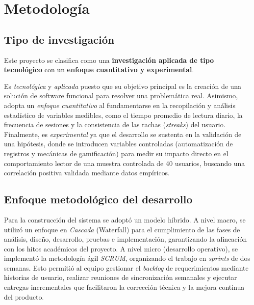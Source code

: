 \documentclass[12pt, atypical, journal]{article}
\begin{document}
\section{Metodología}

\subsection{Tipo de investigación}
Este proyecto se clasifica como una \textbf{investigación aplicada de tipo tecnológico} con un \textbf{enfoque cuantitativo y experimental}. 

Es \textit{tecnológica} y \textit{aplicada} puesto que su objetivo principal es la creación de una solución de software funcional para resolver una problemática real. Asimismo, adopta un \textit{enfoque cuantitativo} al fundamentarse en la recopilación y análisis estadístico de variables medibles, como el tiempo promedio de lectura diario, la frecuencia de sesiones y la consistencia de las rachas (\textit{streaks}) del usuario. Finalmente, es \textit{experimental} ya que el desarrollo se sustenta en la validación de una hipótesis, donde se introducen variables controladas (automatización de registros y mecánicas de gamificación) para medir su impacto directo en el comportamiento lector de una muestra controlada de 40 usuarios, buscando una correlación positiva validada mediante datos empíricos.

\subsection{Enfoque metodológico del desarrollo}
Para la construcción del sistema se adoptó un modelo híbrido. A nivel macro, se utilizó un enfoque en \textit{Cascada} (Waterfall) para el cumplimiento de las fases de análisis, diseño, desarrollo, pruebas e implementación, garantizando la alineación con los hitos académicos del proyecto. A nivel micro (desarrollo operativo), se implementó la metodología ágil \textit{SCRUM}, organizando el trabajo en \textit{sprints} de dos semanas. Esto permitió al equipo gestionar el \textit{backlog} de requerimientos mediante historias de usuario, realizar reuniones de sincronización semanales y ejecutar entregas incrementales que facilitaron la corrección técnica y la mejora continua del producto.
\end{document}
